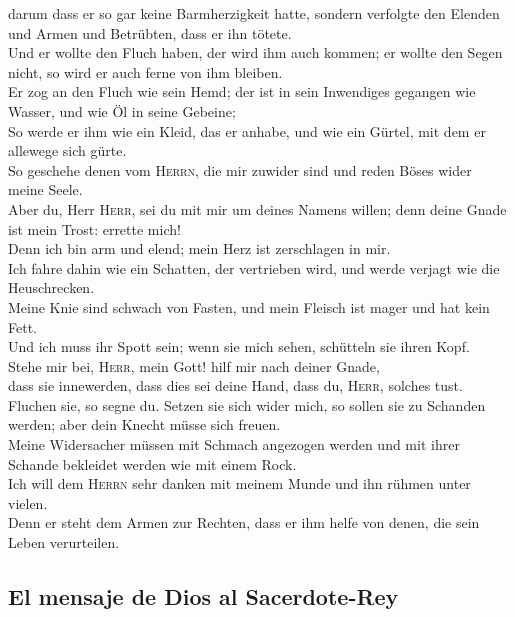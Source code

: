  darum dass er so gar keine Barmherzigkeit hatte, sondern
verfolgte den Elenden und Armen und Betrübten, dass er ihn tötete.\\
 Und er wollte den Fluch haben, der wird ihm auch kommen;
er wollte den Segen nicht, so wird er auch ferne von ihm bleiben.\\
 Er zog an den Fluch wie sein Hemd; der ist in sein
Inwendiges gegangen wie Wasser, und wie Öl in seine Gebeine;\\
 So werde er ihm wie ein Kleid, das er anhabe, und wie
ein Gürtel, mit dem er allewege sich gürte.\\
 So geschehe denen vom \textsc{Herrn}, die mir zuwider
sind und reden Böses wider meine Seele.\\
 Aber du, Herr \textsc{Herr}, sei du mit mir um deines
Namens willen; denn deine Gnade ist mein Trost: errette mich!\\
 Denn ich bin arm und elend; mein Herz ist zerschlagen in
mir.\\
 Ich fahre dahin wie ein Schatten, der vertrieben wird,
und werde verjagt wie die Heuschrecken.\\
 Meine Knie sind schwach von Fasten, und mein Fleisch ist
mager und hat kein Fett.\\
 Und ich muss ihr Spott sein; wenn sie mich sehen,
schütteln sie ihren Kopf.\\
 Stehe mir bei, \textsc{Herr}, mein Gott! hilf mir nach
deiner Gnade,\\
 dass sie innewerden, dass dies sei deine Hand, dass du,
\textsc{Herr}, solches tust.\\
 Fluchen sie, so segne du. Setzen sie sich wider mich, so
sollen sie zu Schanden werden; aber dein Knecht müsse sich freuen.\\
 Meine Widersacher müssen mit Schmach angezogen werden
und mit ihrer Schande bekleidet werden wie mit einem Rock.\\
 Ich will dem \textsc{Herrn} sehr danken mit meinem Munde
und ihn rühmen unter vielen.\\
 Denn er steht dem Armen zur Rechten, dass er ihm helfe
von denen, die sein Leben verurteilen.

\hypertarget{el-mensaje-de-dios-al-sacerdote-rey}{%
\subsection{El mensaje de Dios al
Sacerdote-Rey}\label{el-mensaje-de-dios-al-sacerdote-rey}}

